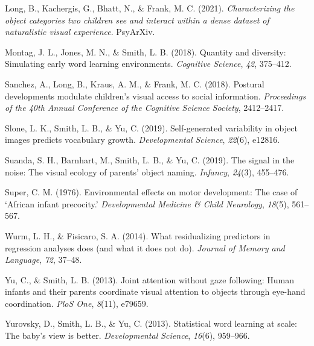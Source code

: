 \documentclass[10pt, letterpaper]{article}
\newenvironment{CSLReferences}%
  {}%
  {\par}
\begin{document}
\begin{CSLReferences}{1}{0}
\leavevmode\hypertarget{ref-long2021characterizing}{}%
Long, B., Kachergis, G., Bhatt, N., \& Frank, M. C. (2021).
\emph{Characterizing the object categories two children see and interact
within a dense dataset of naturalistic visual experience}. PsyArXiv.

\leavevmode\hypertarget{ref-montag2018quantity}{}%
Montag, J. L., Jones, M. N., \& Smith, L. B. (2018). Quantity and
diversity: Simulating early word learning environments. \emph{Cognitive
Science}, \emph{42}, 375--412.

\leavevmode\hypertarget{ref-sanchez2018detecting}{}%
Sanchez, A., Long, B., Kraus, A. M., \& Frank, M. C. (2018). Postural
developments modulate children's visual access to social information.
\emph{{Proceedings of the 40th Annual Conference of the Cognitive
Science Society}}, 2412--2417.

\leavevmode\hypertarget{ref-slone2019self}{}%
Slone, L. K., Smith, L. B., \& Yu, C. (2019). Self-generated variability
in object images predicts vocabulary growth. \emph{Developmental
Science}, \emph{22}(6), e12816.

\leavevmode\hypertarget{ref-suanda2019signal}{}%
Suanda, S. H., Barnhart, M., Smith, L. B., \& Yu, C. (2019). The signal
in the noise: The visual ecology of parents' object naming.
\emph{Infancy}, \emph{24}(3), 455--476.

\leavevmode\hypertarget{ref-super1976environmental}{}%
Super, C. M. (1976). Environmental effects on motor development: The
case of {`{A}frican infant precocity.'} \emph{Developmental Medicine \&
Child Neurology}, \emph{18}(5), 561--567.

\leavevmode\hypertarget{ref-wurm2014residualizing}{}%
Wurm, L. H., \& Fisicaro, S. A. (2014). What residualizing predictors in
regression analyses does (and what it does not do). \emph{Journal of
Memory and Language}, \emph{72}, 37--48.

\leavevmode\hypertarget{ref-yu2013joint}{}%
Yu, C., \& Smith, L. B. (2013). Joint attention without gaze following:
Human infants and their parents coordinate visual attention to objects
through eye-hand coordination. \emph{PloS One}, \emph{8}(11), e79659.

\leavevmode\hypertarget{ref-yurovsky2013statistical}{}%
Yurovsky, D., Smith, L. B., \& Yu, C. (2013). Statistical word learning
at scale: The baby's view is better. \emph{Developmental Science},
\emph{16}(6), 959--966.

\end{CSLReferences}


\end{document}
